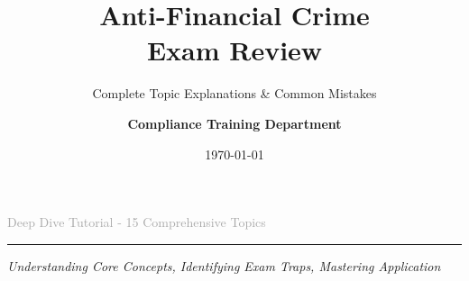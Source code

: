 \documentclass[5pt]{beamer}
\title{\tiny Anti-Financial Crime \\[0.02cm] \tiny Exam Review}
\subtitle{\tiny Complete Topic Explanations \& Common Mistakes}
\author{\tiny \textbf{Compliance Training Department}}
\institute{\tiny Professional Development Program}
\date{\tiny \today}
\begin{document}
	
	\begin{frame}
		\titlepage
		\begin{center}
			\vspace{0.1cm}
			\tiny \textcolor{darkgray}{Deep Dive Tutorial - 15 Comprehensive Topics}
			\vspace{0.05cm}
			\rule{4cm}{0.3pt}
			\vspace{0.05cm}
			\textit{\tiny Understanding Core Concepts, Identifying Exam Traps, Mastering Application}
		\end{center}
	\end{frame}
	
\end{document}
